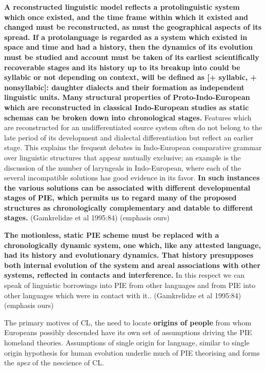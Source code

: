\begin{myquote}
\textbf{A reconstructed linguistic model reflects a protolinguistic system which once existed, and the time frame within which it existed and changed must be reconstructed, as must the geographical aspects of its spread. If a protolanguage is regarded as a system which existed in space and time and had a history, then the dynamics of its evolution must be studied and account must be taken of its earliest scientifically recoverable stages and its history up to its breakup into could be syllabic or not depending on context, will be defined as [+ syllabic, + nonsyllabic]: daughter dialects and their formation as independent linguistic units. Many structural properties of Proto-Indo-European which are reconstructed in classical Indo-European studies as static schemas can be broken down into chronological stages.} Features which are reconstructed for an undifferentiated source system often do not belong to the late period of its development and dialectal differentiation but reflect an earlier stage. This explains the frequent debates in Indo-European comparative grammar over linguistic structures that appear mutually exclusive; an example is the discussion of the number of laryngeals in Indo-European, where each of the several incompatible solutions has good evidence in its favor. \textbf{In such instances the various solutions can be associated with different developmental stages of PIE, which permits us to regard many of the proposed structures as chronologically complementary and datable to different stages.} (Gamkrelidze et al 1995:84) (emphasis ours)
\end{myquote}

\begin{myquote}
\textbf{The motionless, static PIE scheme must be replaced with a chronologically dynamic system, one which, like any attested language, had its history and evolutionary dynamics. That history presupposes both internal evolution of the system and areal associations with other systems, reflected in contacts and interference.} In this respect we can speak of linguistic borrowings into PIE from other languages and from PIE into other languages which were in contact with it.. (Gamkrelidze et al 1995:84) (emphasis ours)
\end{myquote}

The primary motives of CL, the need to locate \textbf{origins of people} from whom Europeans possibly descended have its own set of assumptions driving the PIE homeland theories. Assumptions of single origin for language, similar to single origin hypothesis for human evolution underlie much of PIE theorising and forms the \textit{apex} of the nescience of CL.

